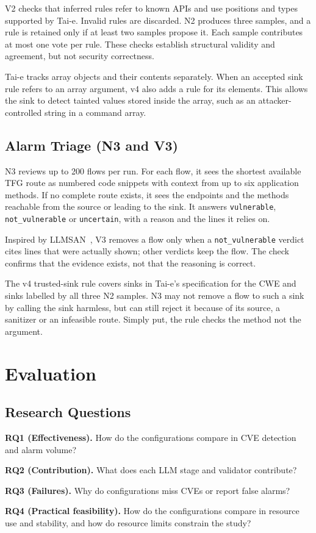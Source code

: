 \documentclass[sigconf]{acmart}
\begin{document}
V2 checks that inferred rules refer to known APIs and use positions and types supported by Tai-e. Invalid rules are discarded. N2 produces three samples, and a rule is retained only if at least two samples propose it. Each sample contributes at most one vote per rule. These checks establish structural validity and agreement, but not security correctness.

Tai-e tracks array objects and their contents separately. When an accepted sink rule refers to an array argument, v4 also adds a rule for its elements. This allows the sink to detect tainted values stored inside the array, such as an attacker-controlled string in a command array.

\subsection{Alarm Triage (N3 and V3)}
N3 reviews up to 200 flows per run. For each flow, it sees the shortest available TFG route as numbered code snippets with context from up to six application methods. If no complete route exists, it sees the endpoints and the methods reachable from the source or leading to the sink. It answers \texttt{vulnerable}, \texttt{not\_vulnerable} or \texttt{uncertain}, with a reason and the lines it relies on.

Inspired by LLMSAN~\cite{wang2024llmsan}, V3 removes a flow only when a \texttt{not\_vulnerable} verdict cites lines that were actually shown; other verdicts keep the flow. The check confirms that the evidence exists, not that the reasoning is correct.

The v4 trusted-sink rule covers sinks in Tai-e's specification for the CWE and sinks labelled by all three N2 samples. N3 may not remove a flow to such a sink by calling the sink harmless, but can still reject it because of its source, a sanitizer or an infeasible route. Simply put, the rule checks the method not the argument.



\section{Evaluation}
\label{sec:eval}
\subsection{Research Questions}
\noindent\textbf{RQ1 (Effectiveness).} How do the configurations compare in CVE detection and alarm volume?\par
\noindent\textbf{RQ2 (Contribution).} What does each LLM stage and validator contribute?\par
\noindent\textbf{RQ3 (Failures).} Why do configurations miss CVEs or report false alarms?\par
\noindent\textbf{RQ4 (Practical feasibility).} How do the configurations compare in resource use and stability, and how do resource limits constrain the study?
\end{document}
